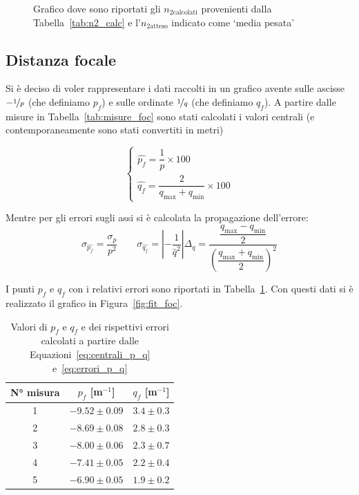 \documentclass[a4paper,12pt]{article}
\begin{document}
\begin{figure}
    \centering
    \resizebox{0.85\textwidth}{!}{%
        
    }
    \caption{Grafico dove sono riportati gli $n_{2\text{calcolati}}$ provenienti dalla Tabella~\ref{tab:n2_calc} e l'$n_{2\text{atteso}}$ indicato come `media pesata'}%
    \label{fig:fit_rif}
\end{figure}

\subsection{Distanza focale}

Si è deciso di voler rappresentare i dati raccolti in un grafico avente sulle ascisse $-\nicefrac{1}{p}$ (che definiamo $p_f$) e sulle ordinate $\nicefrac{1}{q}$ (che definiamo $q_f$). A partire dalle misure in Tabella~\ref{tab:misure_foc} sono stati calcolati i valori centrali (e contemporaneamente sono stati convertiti in metri)

\begin{equation}
    \begin{cases}
        \hat{p_f} = \dfrac{1}{p} \times 100\\
        \hat{q_f} = \dfrac{2}{q_{\max} + q_{\min}} \times 100
    \end{cases}
    \label{eq:centrali_p_q}
\end{equation}

Mentre per gli errori sugli assi si è calcolata la propagazione dell'errore:\\

\begin{equation}
    \sigma_{\hat{p_f}} = \dfrac{\sigma_p}{p^2} \qquad \sigma_{\hat{q_f}} = \left|-\dfrac{1}{\hat{q}^2}\right| \Delta_q = \dfrac{\dfrac{q_{\max} - q_{\min}}{2}}{{\left(\dfrac{q_{\max} + q_{\min}}{2}\right)}^2}
    \label{eq:errori_p_q}
\end{equation}

I punti $p_f$ e $q_f$ con i relativi errori sono riportati in Tabella~\ref{tab:p_and_q_finali}. Con questi dati si è realizzato il grafico in Figura~\ref{fig:fit_foc}.

\begin{table}[h!]
    \centering
    \begin{tabular}{c c c}
        \toprule
        N° misura & $p_f$ [m$^{-1}$] & $q_f$ [m$^{-1}$] \\
        \midrule
        1 & $ -9.52 \pm 0.09 $ & $ 3.4 \pm 0.3 $ \\
        2 & $ -8.69 \pm 0.08 $ & $ 2.8 \pm 0.3 $ \\
        3 & $ -8.00 \pm 0.06 $ & $ 2.3 \pm 0.7 $ \\
        4 & $ -7.41 \pm 0.05 $ & $ 2.2 \pm 0.4 $ \\
        5 & $ -6.90 \pm 0.05 $ & $ 1.9 \pm 0.2 $ \\
        \bottomrule
    \end{tabular}
    \caption{Valori di $p_f$ e $q_f$ e dei rispettivi errori calcolati a partire dalle Equazioni~\ref{eq:centrali_p_q} e~\ref{eq:errori_p_q}}%
    \label{tab:p_and_q_finali}
\end{table}
\end{document}

